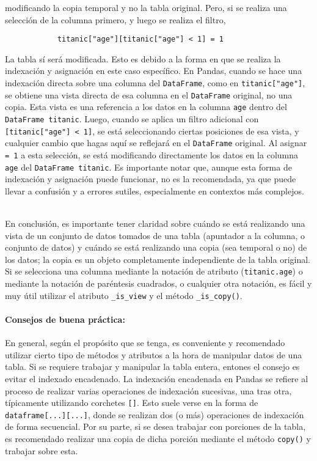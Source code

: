 modificando la copia temporal y no la tabla original.
\noindent Pero, si se realiza una selección de la columna primero, y luego se
realiza el filtro,
\begin{verbatim}
            titanic["age"][titanic["age"] < 1] = 1
            \end{verbatim}
La tabla sí será modificada. Esto es debido a la forma en que se realiza la
indexación y asignación en este caso específico. En Pandas, cuando se hace una
indexación directa sobre una columna del \texttt{DataFrame}, como en
\texttt{titanic["age"]}, se obtiene una vista directa de esa columna en el
\texttt{DataFrame} original, no una copia. Esta vista es una referencia a los
datos en la columna \texttt{age} dentro del \texttt{DataFrame titanic}. Luego,
cuando se aplica un filtro adicional con \texttt{[titanic["age"] < 1]}, se está
seleccionando ciertas posiciones de esa vista, y cualquier cambio que hagas
aquí se reflejará en el \texttt{DataFrame} original. Al asignar \texttt{= 1} a
esta selección, se está modificando directamente los datos en la columna
\texttt{age} del \texttt{DataFrame titanic}. Es importante notar que, aunque
esta forma de indexación y asignación puede funcionar, no es la recomendada, ya
que puede llevar a confusión y a errores sutiles, especialmente en contextos
más complejos. \\\

\noindent En conclusión, es importante tener claridad sobre cuándo se está
realizando una vista de un conjunto de datos tomados de una tabla (apuntador a
la columna, o conjunto de datos) y cuándo se está realizando una copia (sea
temporal o no) de los datos; la copia es un objeto completamente independiente
de la tabla original. Si se selecciona una columna mediante la notación de
atributo (\texttt{titanic.age}) o mediante la notación de paréntesis cuadrados,
o cualquier otra notación, es fácil y muy útil utilizar el atributo
\texttt{\_is\_view} y el método \texttt{\_is\_copy()}.

\paragraph{Consejos de buena práctica:} En general, según el propósito que se
tenga, es conveniente y recomendado utilizar cierto tipo de métodos y atributos
a la hora de manipular datos de una tabla.
Si se requiere trabajar y manipular la tabla entera, entones el consejo es
evitar el indexado encadenado. La indexación encadenada en Pandas se refiere al
proceso de realizar varias operaciones de indexación sucesivas, una tras otra,
típicamente utilizando corchetes \texttt{[]}. Esto suele verse en la forma de
\texttt{dataframe[...][...]}, donde se realizan dos (o más) operaciones de
indexación de forma secuencial. Por su parte, si se desea trabajar con
porciones de la tabla, es recomendado realizar una copia de dicha porción
mediante el método \texttt{copy()} y trabajar sobre esta.

